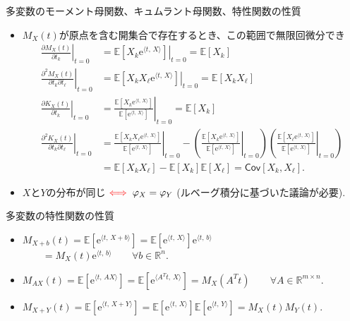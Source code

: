 \documentclass[lualatex,handout]{beamer}
\newcommand{\mycolor}[2]{%
  \begingroup
  \colorlet{currentcolor}{.}%
  \color{#1}#2%
  \color{currentcolor}%
  \endgroup
}
\newcommand{\emm}[1]{\mycolor{red}{#1}}
\newcommand{\expt}[1]{\mathbb{E}\left[#1\right]}
\newcommand{\cov}[1]{\mathsf{Cov}\left[#1\right]}
\theoremstyle{definition}
\begin{document}
\begin{frame}{多変数のモーメント母関数、キュムラント母関数、特性関数の性質}
\small
\begin{itemize}
\setlength{\itemsep}{1em}
\item $M_X(t)$が原点を含む開集合で存在するとき、この範囲で無限回微分でき
\begin{align*}
\left.\frac{\partial M_X(t)}{\partial t_k}\right|_{t=0} &= \left.\expt{X_k\mathrm{e}^{\langle t,\, X\rangle}}\right|_{t=0} = \expt{X_k}\\
\left.\frac{\partial^2 M_X(t)}{\partial t_k\partial t_\ell}\right|_{t=0} &= \left.\expt{X_kX_\ell\mathrm{e}^{\langle t,\, X\rangle}}\right|_{t=0} = \expt{X_kX_\ell}\\
\left.\frac{\partial K_X(t)}{\partial t_k}\right|_{t=0} &= \left.\frac{\expt{X_k\mathrm{e}^{\langle t,\, X\rangle}}}{\expt{\mathrm{e}^{\langle t,\, X\rangle}}}\right|_{t=0} = \expt{X_k}\\
\left.\frac{\partial^2 K_X(t)}{\partial t_k\partial t_\ell}\right|_{t=0} &= \left.\frac{\expt{X_kX_\ell\mathrm{e}^{\langle t,\, X\rangle}}}{\expt{\mathrm{e}^{\langle t,\, X\rangle}}}\right|_{t=0} - \left(\left.\frac{\expt{X_k\mathrm{e}^{\langle t,\, X\rangle}}}{\expt{\mathrm{e}^{\langle t,\, X\rangle}}}\right|_{t=0}\right)\left(\left.\frac{\expt{X_\ell\mathrm{e}^{\langle t,\, X\rangle}}}{\expt{\mathrm{e}^{\langle t,\, X\rangle}}}\right|_{t=0}\right)\\
&= \expt{X_kX_\ell} - \expt{X_k}\expt{X_\ell} = \cov{X_k, X_\ell}.
\end{align*}
\item $X$と$Y$の分布が同じ$\emm{\iff}\varphi_X=\varphi_Y$ (ルベーグ積分に基づいた議論が必要).
\end{itemize}


\vspace{1em}
\end{frame}

\begin{frame}{多変数の特性関数の性質}
\small
\begin{itemize}
\setlength{\itemsep}{1em}
\item $M_{X+b}(t) = \expt{\mathrm{e}^{\langle t,\, X+b\rangle}} = \expt{\mathrm{e}^{\langle t,\, X\rangle}}\mathrm{e}^{\langle t,\,b\rangle}$\\
$\qquad = M_X(t)\mathrm{e}^{\langle t,\, b\rangle}\qquad\forall b\in\mathbb{R}^n$.
\item $M_{AX}(t) = \expt{\mathrm{e}^{\langle t,\, AX\rangle}} = \expt{\mathrm{e}^{\langle A^Tt,\, X\rangle}} = M_X(A^Tt)\qquad\forall A\in\mathbb{R}^{m\times n}$.
\item $M_{X+Y}(t) = \expt{\mathrm{e}^{\langle t,\, X+Y\rangle}} = \expt{\mathrm{e}^{\langle t,\, X\rangle}}\expt{\mathrm{e}^{\langle t,\, Y\rangle}}= M_X(t)M_Y(t)$.
\end{itemize}
\end{frame}
\end{document}

